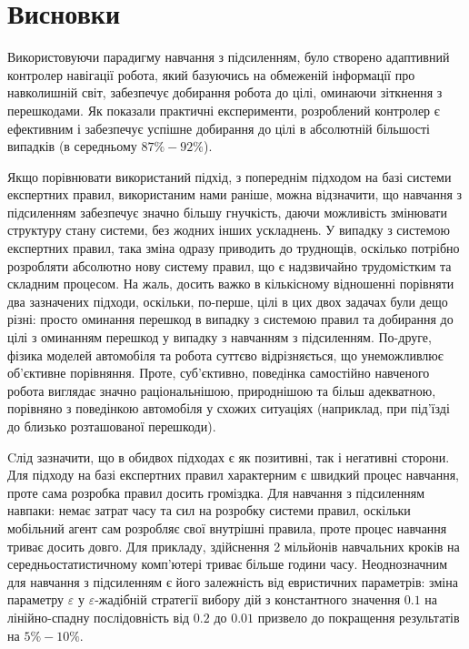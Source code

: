 \newpage

\section{Висновки}

Використовуючи парадигму навчання з підсиленням, було створено адаптивний контролер навігації робота, який базуючись на обмеженій інформації про навколишній світ, забезпечує добирання робота до цілі, оминаючи зіткнення з перешкодами. Як показали практичні експерименти, розроблений контролер є ефективним і забезпечує успішне добирання до цілі в абсолютній більшості випадків (в середньому $87\%-92\%$).

Якщо порівнювати використаний підхід, з попереднім підходом на базі системи експертних правил, використаним нами раніше, можна відзначити, що навчання з підсиленням забезпечує значно більшу гнучкість, даючи можливість змінювати структуру стану системи, без жодних інших ускладнень. У випадку з системою експертних правил, така зміна одразу приводить до труднощів, оскілько потрібно розробляти абсолютно нову систему правил, що є надзвичайно трудомістким та складним процесом. На жаль, досить важко в кількісному відношенні порівняти два зазначених підходи, оскільки, по-перше, цілі в цих двох задачах були дещо різні: просто оминання перешкод в випадку з системою правил та добирання до цілі з оминанням перешкод у випадку з навчанням з підсиленням. По-друге, фізика моделей автомобіля та робота суттєво відрізняється, що унеможливлює об'єктивне порівняння. Проте, суб'єктивно, поведінка самостійно навченого робота виглядає значно раціональнішою, природнішою та більш адекватною, порівняно з поведінкою автомобіля у схожих ситуаціях (наприклад, при під'їзді до близько розташованої перешкоди).

Cлід зазначити, що в обидвох підходах є як позитивні, так і негативні сторони. Для підходу на базі експертних правил характерним є швидкий процес навчання, проте сама розробка правил досить громіздка. Для навчання з підсиленням навпаки: немає затрат часу та сил на розробку системи правил, оскільки мобільний агент сам розробляє свої внутрішні правила, проте процес навчання триває досить довго. Для прикладу, здійснення 2 мільйонів навчальних кроків на середньостатистичному комп'ютері триває більше години часу. Неоднозначним для навчання з підсиленням є його залежність від евристичних параметрів: зміна параметру $\varepsilon$ у $\varepsilon$-жадібній стратегії вибору дій з константного значення $0.1$ на лінійно-спадну послідовність від $0.2$ до $0.01$ призвело до покращення результатів на $5\%-10\%$.

